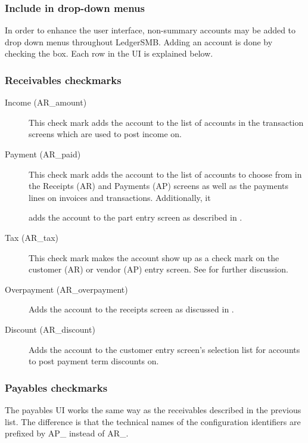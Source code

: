 \subsubsection{Include in drop-down menus}
\label{subsec-coa-account-links}

In order to enhance the user interface, non-summary accounts may be added to drop down menus throughout LedgerSMB.  Adding
an account is done by checking the box.  Each row in the UI is explained below.

\subsubsection{Receivables checkmarks}
\label{subsubsec-coa-AR-checkmarks}

\begin{description}
    \item[Income (AR\_amount)] This check mark adds the account to the list of accounts
    in the transaction screens which are used to post income on.

    \item[Payment (AR\_paid)] This check mark adds the account to the list of accounts
    to choose from in the Receipts (AR) and Payments (AP) screens as well as the payments lines on invoices and transactions. Additionally, it

    adds the account to the part entry screen as described in .
    \item[Tax (AR\_tax)] This check mark makes the account show up as a check mark on the
    \gls{customer} (AR) or vendor (AP) entry screen. See  for further discussion.
    \item[Overpayment (AR\_overpayment)] Adds the account to the receipts screen as discussed
    in .
    \item[Discount (AR\_discount)] Adds the account to the customer entry screen's selection
    list for accounts to post payment term discounts on.

\end{description}

\subsubsection{Payables checkmarks}
\label{subsubsec-coa-AP-checkmarks}

The payables UI works the same way as the receivables described in the previous list. The difference is
that the technical names of the configuration identifiers are prefixed by AP\_ instead
of AR\_.

